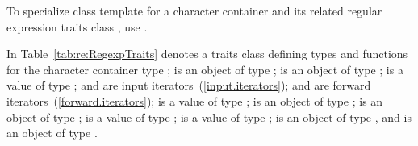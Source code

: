 \pnum
To specialize class template  for a character
container  and its related regular
expression traits class , use .

\pnum
{}%
%
%
%
In Table~\ref{tab:re:RegexpTraits}  denotes a traits class
defining types and functions for the character container
type ;  is an object of
type ;  is an object of type ;  is a value of type ; 
and  are input iterators~(\ref{input.iterators});
 and  are forward iterators~(\ref{forward.iterators}); 
 is a value of type ;
 is an object of type ; 
 is an object of type ; 
 is a value of  type ; 
 is a value of type ; 
 is an object of type ,
and  is an object of type .

